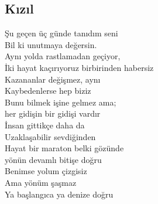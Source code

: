 \subsection{Kızıl}

Şu geçen üç günde tanıdım seni \\
Bil ki unutmaya değersin. \\
Aynı yolda rastlamadan geçiyor, \\
İki hayat kaçırıyoruz birbirinden habersiz \\
Kazananlar değişmez, aynı \\
Kaybedenlerse hep biziz \\

\noindent\newline
Bunu bilmek işine gelmez ama; \\
her gidişin bir gidişi vardır \\
İnsan gittikçe daha da \\
Uzaklaşabilir sevdiğinden \\

\noindent\newline
Hayat bir maraton belki gözünde \\
yönün devamlı bitişe doğru \\
Benimse yolum çizgisiz \\
Ama yönüm şaşmaz \\
Ya başlangıca ya denize doğru \\